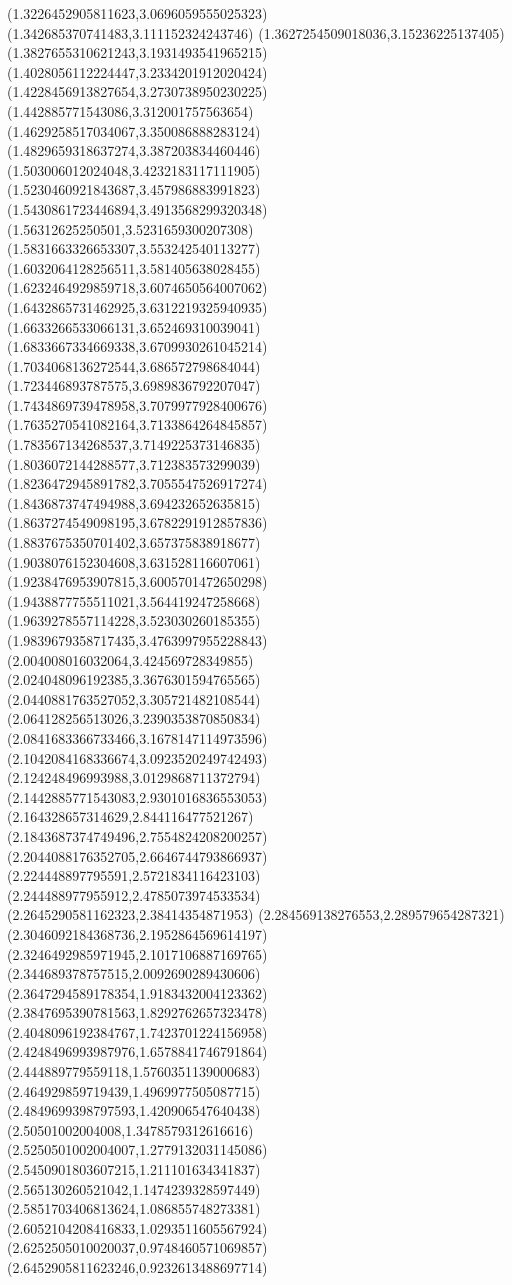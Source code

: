 {(1.3226452905811623,3.0696059555025323)
(1.342685370741483,3.111152324243746)
(1.3627254509018036,3.15236225137405)
(1.3827655310621243,3.1931493541965215)
(1.4028056112224447,3.2334201912020424)
(1.4228456913827654,3.2730738950230225)
(1.442885771543086,3.312001757563654)
(1.4629258517034067,3.350086888283124)
(1.4829659318637274,3.387203834460446)
(1.503006012024048,3.4232183117111905)
(1.5230460921843687,3.457986883991823)
(1.5430861723446894,3.4913568299320348)
(1.56312625250501,3.5231659300207308)
(1.5831663326653307,3.553242540113277)
(1.6032064128256511,3.581405638028455)
(1.6232464929859718,3.6074650564007062)
(1.6432865731462925,3.6312219325940935)
(1.6633266533066131,3.652469310039041)
(1.6833667334669338,3.6709930261045214)
(1.7034068136272544,3.686572798684044)
(1.723446893787575,3.6989836792207047)
(1.7434869739478958,3.7079977928400676)
(1.7635270541082164,3.7133864264845857)
(1.783567134268537,3.7149225373146835)
(1.8036072144288577,3.712383573299039)
(1.8236472945891782,3.7055547526917274)
(1.8436873747494988,3.694232652635815)
(1.8637274549098195,3.6782291912857836)
(1.8837675350701402,3.657375838918677)
(1.9038076152304608,3.631528116607061)
(1.9238476953907815,3.6005701472650298)
(1.9438877755511021,3.564419247258668)
(1.9639278557114228,3.523030260185355)
(1.9839679358717435,3.4763997955228843)
(2.004008016032064,3.424569728349855)
(2.024048096192385,3.3676301594765565)
(2.0440881763527052,3.305721482108544)
(2.064128256513026,3.2390353870850834)
(2.0841683366733466,3.1678147114973596)
(2.1042084168336674,3.0923520249742493)
(2.124248496993988,3.0129868711372794)
(2.1442885771543083,2.9301016836553053)
(2.164328657314629,2.844116477521267)
(2.1843687374749496,2.7554824208200257)
(2.2044088176352705,2.6646744793866937)
(2.224448897795591,2.5721834116423103)
(2.244488977955912,2.4785073974533534)
(2.2645290581162323,2.38414354871953)
(2.284569138276553,2.289579654287321)
(2.3046092184368736,2.1952864569614197)
(2.3246492985971945,2.1017106887169765)
(2.344689378757515,2.0092690289430606)
(2.3647294589178354,1.9183432004123362)
(2.3847695390781563,1.8292762657323478)
(2.4048096192384767,1.7423701224156958)
(2.4248496993987976,1.6578841746791864)
(2.444889779559118,1.5760351139000683)
(2.464929859719439,1.4969977505087715)
(2.4849699398797593,1.420906547640438)
(2.50501002004008,1.3478579312616616)
(2.5250501002004007,1.2779132031145086)
(2.5450901803607215,1.211101634341837)
(2.565130260521042,1.1474239328597449)
(2.5851703406813624,1.086855748273381)
(2.6052104208416833,1.0293511605567924)
(2.6252505010020037,0.9748460571069857)
(2.6452905811623246,0.9232613488697714)
}
